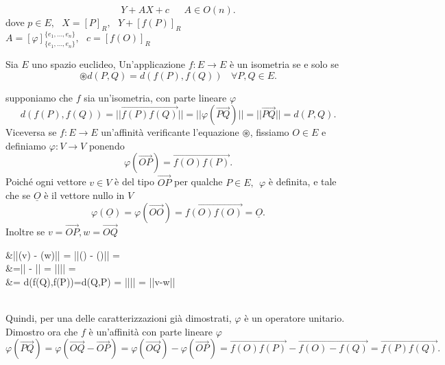 \documentclass[12px]{article}
\begin{document}
\[
Y + AX + c \ \ \ \ \ \ \ A\in O(n)
.\] 
dove $p\in E, \ \ \ X = [P]_R, \ \ \ Y + [f(P)]_R$\\
$A = [\varphi]^{\{e_1,\ldots,e_n\}}_{\{e_1,\ldots,e_n\}}, \ \ \ c = [f(O)]_R$
\begin{teo}
	Sia $E$ uno spazio euclideo, Un'applicazione $f:E \rightarrow E$ è un isometria se e solo se
	\[
	 \circledast d(P,Q) = d(f(P),f(Q))\ \ \ \ \forall P,Q\in E
	.\] 
\end{teo}
\begin{dimo}
	supponiamo che $f$ sia un'isometria, con parte lineare $\varphi$ 
	\[
	d(f(P),f(Q)) = ||\overrightarrow{f(P)f(Q)}|| = ||\varphi(\overrightarrow{PQ})|| = ||\overrightarrow{PQ}|| = d(P,Q)
	.\] 
	Viceversa se $f: E \rightarrow E$ un'affinità verificante l'equazione $\circledast$, fissiamo $O\in E$ e definiamo $\varphi:V \rightarrow V$ ponendo
	\[
	 \varphi(\overrightarrow{OP}) = \overrightarrow{f(O)f(P)}
	.\] 
	Poiché ogni vettore $v\in V$ è del tipo $\overrightarrow{OP}$ per qualche $P\in E, \ \ \varphi$ è definita, e tale che se $\underline{O}$ è il vettore nullo in $V$
	\[
		\varphi(\underline{O}) = \varphi(\overrightarrow{OO}) = \overrightarrow{f(O)f(O)} = \underline{O}
	.\]
	Inoltre se $v = \overrightarrow{OP}, w = \overrightarrow{OQ}$ \\
	\begin{aligned}
		&||\varphi(v) - \varphi(w)|| = ||\varphi() - \varphi()|| =\\
		&=|| - || = |||| =\\&= d(f(Q),f(P))=d(Q,P) = |||| = ||v-w||
	\end{aligned}\\
	Quindi, per una delle caratterizzazioni già dimostrati, $\varphi$ è un operatore unitario. Dimostro ora che $f$ è un'affinità con parte lineare $\varphi$
	\[
	\varphi(\overrightarrow{PQ}) = \varphi(\overrightarrow{OQ} - \overrightarrow{OP} ) = \varphi(\overrightarrow{OQ}) - \varphi(\overrightarrow{OP}) = \overrightarrow{f(O)f(P)} - \overrightarrow{f(O) - f(Q)} = \overrightarrow{f(P)f(Q)}
	.\] 
\end{dimo}
\end{document}
